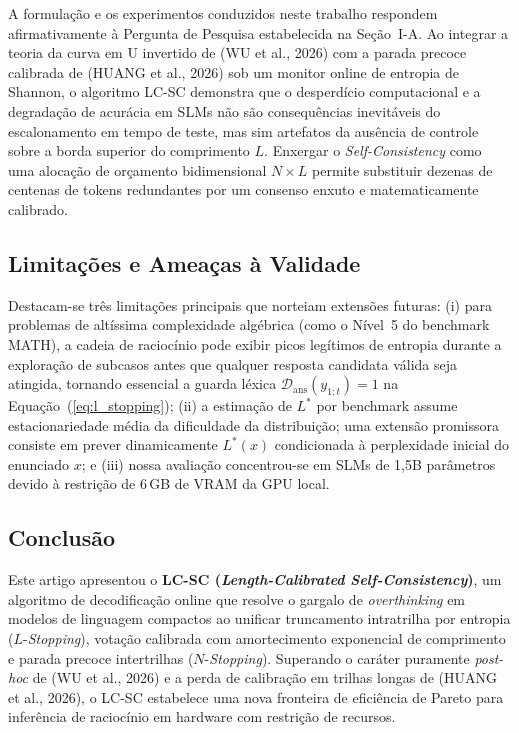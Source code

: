 \documentclass[9pt,conference]{IEEEtran}
\begin{document}
A formula\c{c}\~{a}o e os experimentos conduzidos neste trabalho respondem afirmativamente \`{a} Pergunta de Pesquisa estabelecida na Se\c{c}\~{a}o~I-A. Ao integrar a teoria da curva em U invertido de (WU et al., 2026) com a parada precoce calibrada de (HUANG et al., 2026) sob um monitor online de entropia de Shannon, o algoritmo LC-SC demonstra que o desperd\'{i}cio computacional e a degrada\c{c}\~{a}o de acur\'{a}cia em SLMs n\~{a}o s\~{a}o consequ\^{e}ncias inevit\'{a}veis do escalonamento em tempo de teste, mas sim artefatos da aus\^{e}ncia de controle sobre a borda superior do comprimento $L$. Enxergar o \textit{Self-Consistency} como uma alocação de orçamento bidimensional $N \times L$ permite substituir dezenas de centenas de tokens redundantes por um consenso enxuto e matematicamente calibrado.

\subsection{Limita\c{c}\~{o}es e Amea\c{c}as \`{a} Validade}

Destacam-se tr\^{e}s limita\c{c}\~{o}es principais que norteiam extens\~{o}es futuras: (i) para problemas de alt\'{i}ssima complexidade alg\'{e}brica (como o N\'{i}vel~5 do benchmark MATH), a cadeia de racioc\'{i}nio pode exibir picos leg\'{i}timos de entropia durante a explora\c{c}\~{a}o de subcasos antes que qualquer resposta candidata v\'{a}lida seja atingida, tornando essencial a guarda l\'{e}xica $\mathcal{D}_{\text{ans}}(y_{1:t}) = 1$ na Equa\c{c}\~{a}o~(\ref{eq:l_stopping}); (ii) a estima\c{c}\~{a}o de $L^*$ por benchmark assume estacionariedade m\'{e}dia da dificuldade da distribui\c{c}\~{a}o; uma extens\~{a}o promissora consiste em prever dinamicamente $L^*(x)$ condicionada \`{a} perplexidade inicial do enunciado $x$; e (iii) nossa avalia\c{c}\~{a}o concentrou-se em SLMs de 1,5B par\^{a}metros devido \`{a} restri\c{c}\~{a}o de 6\,GB de VRAM da GPU local.

\subsection{Conclus\~{a}o}

Este artigo apresentou o \textbf{LC-SC (\textit{Length-Calibrated Self-Consistency})}, um algoritmo de decodifica\c{c}\~{a}o online que resolve o gargalo de \textit{overthinking} em modelos de linguagem compactos ao unificar truncamento intratrilha por entropia ($L$-\textit{Stopping}), vota\c{c}\~{a}o calibrada com amortecimento exponencial de comprimento e parada precoce intertrilhas ($N$-\textit{Stopping}). Superando o car\'{a}ter puramente \textit{post-hoc} de (WU et al., 2026) e a perda de calibra\c{c}\~{a}o em trilhas longas de (HUANG et al., 2026), o LC-SC estabelece uma nova fronteira de efici\^{e}ncia de Pareto para infer\^{e}ncia de racioc\'{i}nio em hardware com restri\c{c}\~{a}o de recursos.
\end{document}
